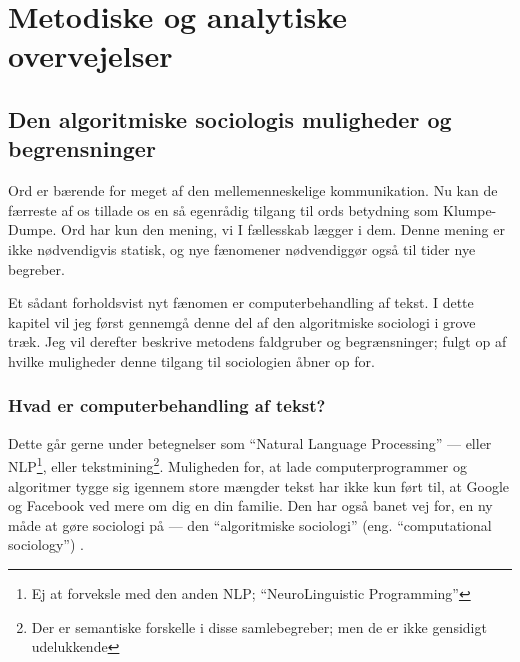 \renewcommand*{\afterpartskip}{
\vfil
\epigraph{\itshape
“Når jeg anvender et ord,” sagde Klumpe-Dumpe temmelig hånligt, “så betyder det lige netop, hvad jeg vil have, det skal betyde — hverken mere eller mindre.”

“Men spørgsmålet er,” sagde Alice, “om du kan få ordene til at betyde vidt forskellige ting.”

“Spørgsmålet er,” sagde Klumpe-Dumpe, “hvem det er, der bestemmer — det er det, der er det afgørende.”
}{Lewis Carroll, \textit{Bag spejlet, og hvad Alice fandt der} (\citeyear{carrollAliceEventyrlandOg1977})}
}

\part{Metodiske og analytiske overvejelser}\label{part:method}

\chapter{Den algoritmiske sociologis muligheder og begrensninger}

Ord er bærende for meget af den mellemenneskelige kommunikation.
Nu kan de færreste af os tillade os en så egenrådig tilgang til ords betydning som Klumpe-Dumpe.
Ord har kun den mening, vi I fællesskab lægger i dem.
Denne mening er ikke nødvendigvis statisk, og nye fænomener nødvendiggør også til tider nye begreber.

Et sådant forholdsvist nyt fænomen er computerbehandling af tekst.
I dette kapitel vil jeg først gennemgå denne del af den algoritmiske sociologi i grove træk.
Jeg vil derefter beskrive metodens faldgruber og begrænsninger; fulgt op af hvilke muligheder denne tilgang til sociologien åbner op for.

\section{Hvad er computerbehandling af tekst?}

Dette går gerne under betegnelser som “Natural Language Processing” — eller NLP\footnote{Ej at forveksle med den anden NLP; “NeuroLinguistic Programming”}, eller tekstmining\footnote{Der er semantiske forskelle i disse samlebegreber; men de er ikke gensidigt udelukkende}.
Muligheden for, at lade computerprogrammer og algoritmer tygge sig igennem store mængder tekst har ikke kun ført til, at Google og Facebook ved mere om dig en din familie.
Den har også banet vej for, en ny måde at gøre sociologi på — den “algoritmiske sociologi” (eng. “computational sociology”) \autocite{evansComputationSociologicalImagination2019}.

